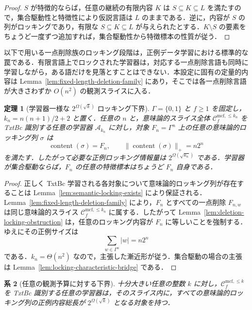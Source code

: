 \documentclass[11pt,a4paper]{ltjsarticle}
\numberwithin{equation}{section}
\theoremstyle{plain}
\newtheorem{theorem}{定理}[section]
\newtheorem{corollary}[theorem]{系}
\theoremstyle{definition}
\theoremstyle{remark}
\newcommand{\Clatent}[2]{\mathcal{C}^{\mathrm{mcf},\le #2}_{#1}}
\begin{document}
\begin{proof}
\(S\) が特徴的ならば，任意の継続の有限内容 \(K\) は \(S\subseteq K\subseteq L\) を満たすので，集合駆動性と特徴性により仮説言語は \(L\) のままである．逆に，内容が \(S\) の列がロッキングであり，有限な \(S\subseteq K\subseteq L\) が与えられたとする．\(K\setminus S\) の要素をちょうど一度ずつ追加すれば，集合駆動性から特徴標本の性質が従う．
\end{proof}

以下で用いる一点削除族のロッキング段階は，正例データ学習における標準的な罠である．有限言語上でロックされた学習器は，対応する一点削除言語も同時に学習しながら，ある語だけを見落とすことはできない．本設定に固有の定量的内容は Lemma~\ref{lem:fixed-length-deletion-family} にあり，そこでは各一点削除言語が大きさわずか \(O(n^2)\) の観測スライスに入る．

\begin{theorem}[学習器一様な \(2^{\Omega(\sqrt{k})}\) ロッキング下界]
\label{thm:no-uniform-polynomial-k-data}
\(\Gamma=\{0,1\}\) と \(f\ge1\) を固定し，\(k_n=n(n+1)/2+2\) と置く．任意の \(n\) と，意味論的スライス全体 \(\Clatent{f}{k_n}\) を TxtBc 識別する任意の学習器 \(\mathcal A_{k_n}\) に対し，対象 \(F_n=\Gamma^n\) 上の任意の意味論的ロッキング列 \(\sigma\) は
\[
  \operatorname{content}(\sigma)=F_n,
  \qquad
  \|\operatorname{content}(\sigma)\|_+=n2^n
\]
を満たす．したがって必要な正例ロッキング情報量は
\(2^{\Omega(\sqrt{k_n})}\) である．学習器が集合駆動ならば，\(F_n\) の任意の特徴標本はちょうど \(F_n\) 自身である．
\end{theorem}

\begin{proof}
正しく TxtBc 学習される各対象について意味論的ロッキング列が存在することは Lemma~\ref{lem:semantic-locking-exists} により保証される．Lemma~\ref{lem:fixed-length-deletion-family} により，\(F_n\) とすべての一点削除 \(F_{n,w}\) は同じ意味論的スライス \(\Clatent{f}{k_n}\) に属する．したがって Lemma~\ref{lem:deletion-locking-obstruction} は，任意のロッキング内容が \(F_n\) に等しいことを強制する．ゆえにその正例サイズは
\[
  \sum_{w\in\Gamma^n}|w|=n2^n
\]
である．\(k_n=\Theta(n^2)\) なので，主張した漸近形が従う．集合駆動の場合の主張は Lemma~\ref{lem:locking-characteristic-bridge} である．
\end{proof}

\begin{corollary}[任意の観測予算に対する下界]
\label{cor:locking-lower-bound-all-k}
十分大きい任意の整数 \(k\) に対し，\(\Clatent{f}{k}\) を TxtBc 識別する任意の学習器は，そのスライス内に，すべての意味論的ロッキング列の正例内容総長が \(2^{\Omega(\sqrt{k})}\) となる対象を持つ．
\end{corollary}
\end{document}
